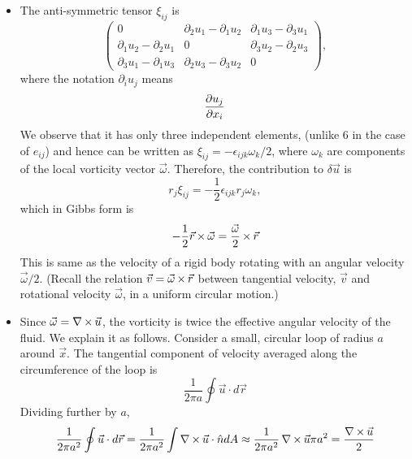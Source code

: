 \begin{itemize}
\item The anti-symmetric tensor $\xi_{ij}$ is
\[
\begin{pmatrix}
0 & \partial_2 u_1 - \partial_1 u_2 & \partial_1 u_3 - \partial_3 u_1 \\
\partial_1 u_2 - \partial_2 u_1 & 0 & \partial_3 u_2 - \partial_2 u_3 \\
\partial_3 u_1 - \partial_1 u_3 & \partial_2 u_3 - \partial_3 u_2 & 0
\end{pmatrix},
\]
where the notation $\partial_i u_j$ means
\[
\frac{\partial{u_j}}{\partial{x_i}}
\]
We observe that it has only three independent elements, (unlike $6$ in the case of $e_{ij}$) and hence can be written as $\xi_{ij} = -\epsilon_{ijk}\omega_k/2$, where $\omega_k$ are
components of the local vorticity vector $\vec{\omega}$. Therefore, the contribution to $\delta\vec{u}$ is
\[
r_j\xi_{ij} = -\frac{1}{2}\epsilon_{ijk}r_j\omega_k,
\]
which in Gibbs form is 
\[
-\frac{1}{2}\vec{r}\operatorname{\times}\vec{\omega} = \frac{\vec{\omega}}{2}\operatorname{\times}\vec{r}
\]
This is same as the velocity of a rigid body rotating with an angular velocity $\vec{\omega}/2$. (Recall the relation $\vec{v} = \vec{\omega}\operatorname{\times}\vec{r}$ between tangential velocity, 
$\vec{v}$ and rotational velocity $\vec{\omega}$, in a uniform circular motion.)

\item Since $\vec{\omega} = \operatorname{\nabla\operatorname{\times}}{\vec{u}}$, the vorticity is twice the effective angular velocity of the fluid. We explain it as follows. Consider a small, circular loop of radius $a$ 
around $\vec{x}$. The tangential component of velocity averaged along the circumference of the loop is
\[
\frac{1}{2\pi a}\oint\vec{u}\cdot d\vec{r}
\] 
Dividing further by $a$,
\[
\frac{1}{2\pi a^2}\oint\vec{u}\cdot d\vec{r} = \frac{1}{2\pi a^2}\int\operatorname{\nabla\operatorname{\times}}{\vec{u}}\cdot\hat{n} dA \approx \frac{1}{2\pi a^2} \operatorname{\nabla\operatorname{\times}}{\vec{u}} \pi a^2 = \frac{\operatorname{\nabla\operatorname{\times}}{\vec{u}}}{2}
\] 


\end{itemize}
